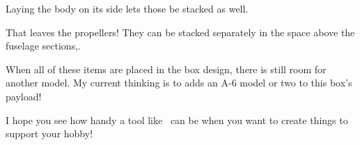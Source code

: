 Laying the body on its side lets those be stacked as well.

That leaves the propellers! They can be stacked separately in the space above
the fuselage sections,.

When all of these items are placed in the box design, there is still room for
another model. My current thinking is to adds an A-6 model or two to this box's
payload!

I hope you see how handy a tool like \osc\ can be when you want to create
things to support your hobby!
